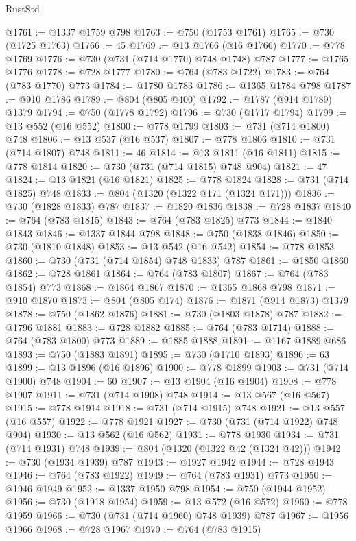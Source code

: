 \begin{lexlean}{RustStd}
\begin{coremodule}
@1761 := @1337 @1759 @798
@1763 := @750 (@1753 @1761)
@1765 := @730 (@1725 @1763)
@1766 := 45
@1769 := @13 @1766 (@16 @1766)
@1770 := @778 @1769
@1776 := @730 (@731 (@714 @1770) @748 @1748) @787
@1777 := @1765 @1776
@1778 := @728 @1777
@1780 := @764 (@783 @1722)
@1783 := @764 (@783 @1770) @773
@1784 := @1780 @1783
@1786 := @1365 @1784 @798
@1787 := @910 @1786
@1789 := @804 (@805 @400)
@1792 := @1787 (@914 @1789) @1379
@1794 := @750 (@1778 @1792)
@1796 := @730 (@1717 @1794)
@1799 := @13 @552 (@16 @552)
@1800 := @778 @1799
@1803 := @731 (@714 @1800) @748
@1806 := @13 @537 (@16 @537)
@1807 := @778 @1806
@1810 := @731 (@714 @1807) @748
@1811 := 46
@1814 := @13 @1811 (@16 @1811)
@1815 := @778 @1814
@1820 := @730 (@731 (@714 @1815) @748 @904)
@1821 := 47
@1824 := @13 @1821 (@16 @1821)
@1825 := @778 @1824
@1828 := @731 (@714 @1825) @748
@1833 := @804 (@1320 (@1322 @171 (@1324 @171)))
@1836 := @730 (@1828 @1833) @787
@1837 := @1820 @1836
@1838 := @728 @1837
@1840 := @764 (@783 @1815)
@1843 := @764 (@783 @1825) @773
@1844 := @1840 @1843
@1846 := @1337 @1844 @798
@1848 := @750 (@1838 @1846)
@1850 := @730 (@1810 @1848)
@1853 := @13 @542 (@16 @542)
@1854 := @778 @1853
@1860 := @730 (@731 (@714 @1854) @748 @1833) @787
@1861 := @1850 @1860
@1862 := @728 @1861
@1864 := @764 (@783 @1807)
@1867 := @764 (@783 @1854) @773
@1868 := @1864 @1867
@1870 := @1365 @1868 @798
@1871 := @910 @1870
@1873 := @804 (@805 @174)
@1876 := @1871 (@914 @1873) @1379
@1878 := @750 (@1862 @1876)
@1881 := @730 (@1803 @1878) @787
@1882 := @1796 @1881
@1883 := @728 @1882
@1885 := @764 (@783 @1714)
@1888 := @764 (@783 @1800) @773
@1889 := @1885 @1888
@1891 := @1167 @1889 @686
@1893 := @750 (@1883 @1891)
@1895 := @730 (@1710 @1893)
@1896 := 63
@1899 := @13 @1896 (@16 @1896)
@1900 := @778 @1899
@1903 := @731 (@714 @1900) @748
@1904 := 60
@1907 := @13 @1904 (@16 @1904)
@1908 := @778 @1907
@1911 := @731 (@714 @1908) @748
@1914 := @13 @567 (@16 @567)
@1915 := @778 @1914
@1918 := @731 (@714 @1915) @748
@1921 := @13 @557 (@16 @557)
@1922 := @778 @1921
@1927 := @730 (@731 (@714 @1922) @748 @904)
@1930 := @13 @562 (@16 @562)
@1931 := @778 @1930
@1934 := @731 (@714 @1931) @748
@1939 := @804 (@1320 (@1322 @42 (@1324 @42)))
@1942 := @730 (@1934 @1939) @787
@1943 := @1927 @1942
@1944 := @728 @1943
@1946 := @764 (@783 @1922)
@1949 := @764 (@783 @1931) @773
@1950 := @1946 @1949
@1952 := @1337 @1950 @798
@1954 := @750 (@1944 @1952)
@1956 := @730 (@1918 @1954)
@1959 := @13 @572 (@16 @572)
@1960 := @778 @1959
@1966 := @730 (@731 (@714 @1960) @748 @1939) @787
@1967 := @1956 @1966
@1968 := @728 @1967
@1970 := @764 (@783 @1915)

\end{coremodule}
\end{lexlean}
